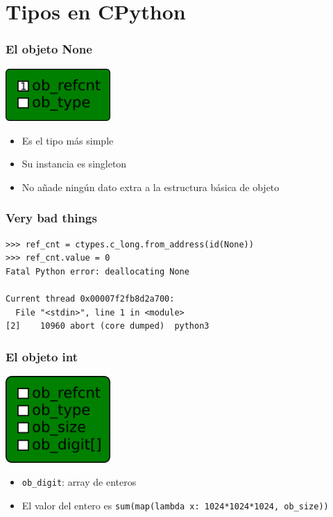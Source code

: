 \documentclass[10pt]{beamer}
\begin{document}
  \section*{Tipos en CPython}

  \begin{frame}[containsverbatim]
    \frametitle{El objeto None}
    \begin{center}\includegraphics[width=4cm]{img/None.png}\end{center}
    \begin{itemize}
      \item Es el tipo más simple
      \item Su instancia es singleton
      \item No añade ningún dato extra a la estructura básica de objeto
    \end{itemize}
  \end{frame}

  \begin{frame}[containsverbatim]
    \frametitle{Very bad things}
    \begin{verbatim}
>>> ref_cnt = ctypes.c_long.from_address(id(None))
>>> ref_cnt.value = 0
Fatal Python error: deallocating None

Current thread 0x00007f2fb8d2a700:
  File "<stdin>", line 1 in <module>
[2]    10960 abort (core dumped)  python3
    \end{verbatim}
  \end{frame}

  \begin{frame}[containsverbatim]
    \frametitle{El objeto int}
    \begin{center}\includegraphics[width=4cm]{img/Int.png}\end{center}
    \begin{itemize}
      \item \verb+ob_digit+: array de enteros
      \item El valor del entero es \verb+sum(map(lambda x: 1024*1024*1024, ob_size))+
    \end{itemize}
  \end{frame}
\end{document}
